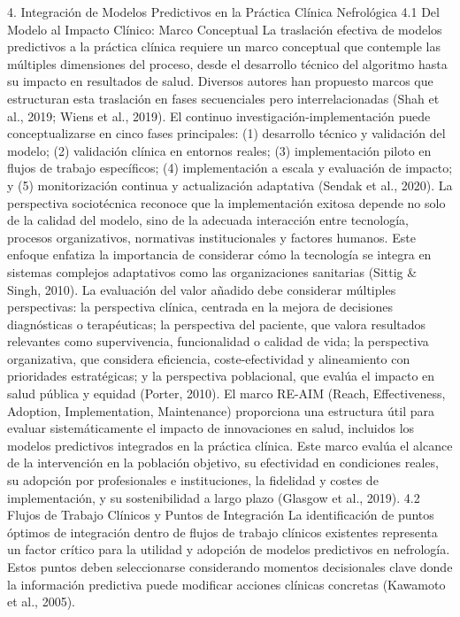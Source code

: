 \documentclass{article}
\begin{document}
\begin{multicols}{2}
 4. Integración de Modelos Predictivos en la Práctica Clínica Nefrológica
 4.1 Del Modelo al Impacto Clínico: Marco Conceptual
La traslación efectiva de modelos predictivos a la práctica clínica requiere un marco conceptual que contemple las múltiples dimensiones del proceso, desde el desarrollo técnico del algoritmo hasta su impacto en resultados de salud. Diversos autores han propuesto marcos que estructuran esta traslación en fases secuenciales pero interrelacionadas (Shah et al., 2019; Wiens et al., 2019).
El continuo investigación-implementación puede conceptualizarse en cinco fases principales: (1) desarrollo técnico y validación del modelo; (2) validación clínica en entornos reales; (3) implementación piloto en flujos de trabajo específicos; (4) implementación a escala y evaluación de impacto; y (5) monitorización continua y actualización adaptativa (Sendak et al., 2020).
La perspectiva sociotécnica reconoce que la implementación exitosa depende no solo de la calidad del modelo, sino de la adecuada interacción entre tecnología, procesos organizativos, normativas institucionales y factores humanos. Este enfoque enfatiza la importancia de considerar cómo la tecnología se integra en sistemas complejos adaptativos como las organizaciones sanitarias (Sittig \& Singh, 2010).
La evaluación del valor añadido debe considerar múltiples perspectivas: la perspectiva clínica, centrada en la mejora de decisiones diagnósticas o terapéuticas; la perspectiva del paciente, que valora resultados relevantes como supervivencia, funcionalidad o calidad de vida; la perspectiva organizativa, que considera eficiencia, coste-efectividad y alineamiento con prioridades estratégicas; y la perspectiva poblacional, que evalúa el impacto en salud pública y equidad (Porter, 2010).
El marco RE-AIM (Reach, Effectiveness, Adoption, Implementation, Maintenance) proporciona una estructura útil para evaluar sistemáticamente el impacto de innovaciones en salud, incluidos los modelos predictivos integrados en la práctica clínica. Este marco evalúa el alcance de la intervención en la población objetivo, su efectividad en condiciones reales, su adopción por profesionales e instituciones, la fidelidad y costes de implementación, y su sostenibilidad a largo plazo (Glasgow et al., 2019).
 4.2 Flujos de Trabajo Clínicos y Puntos de Integración
La identificación de puntos óptimos de integración dentro de flujos de trabajo clínicos existentes representa un factor crítico para la utilidad y adopción de modelos predictivos en nefrología. Estos puntos deben seleccionarse considerando momentos decisionales clave donde la información predictiva puede modificar acciones clínicas concretas (Kawamoto et al., 2005).

\end{multicols}
\end{document}
